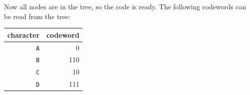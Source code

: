 Now all nodes are in the tree, so the code is ready.
The following codewords can be read from the tree:
\begin{center}
\begin{tabular}{rr}
character & codeword \\
\hline
\texttt{A} & 0 \\
\texttt{B} & 110 \\
\texttt{C} & 10 \\
\texttt{D} & 111 \\
\end{tabular}
\end{center}
